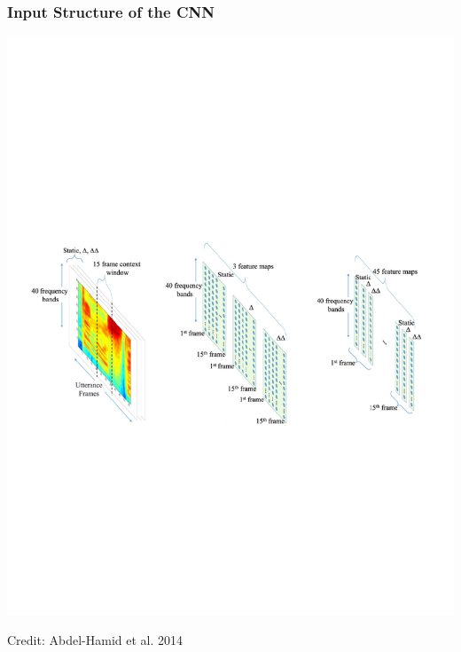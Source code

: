 \documentclass[notes]{beamer}
\begin{document}
\begin{frame}
	\frametitle{Input Structure of the CNN}
	\includegraphics[scale=0.6, trim=1.1cm 8cm 0 7.5cm, clip=true]{cnn-input.pdf}
	\begin{center}
		\tiny{Credit: Abdel-Hamid et al. 2014}
	\end{center}
\end{frame}
\end{document}
